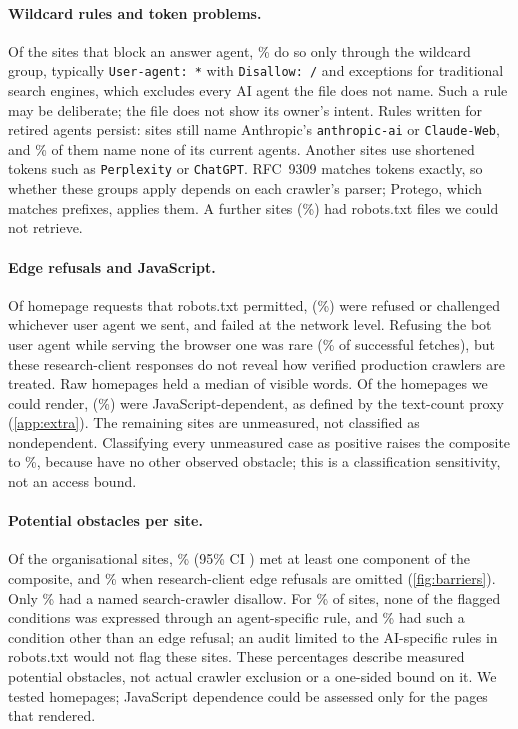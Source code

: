 \documentclass[11pt]{article}
\newcommand{\agent}[1]{\texttt{#1}}
\begin{document}
\paragraph{Wildcard rules and token problems.}
\label{sec:config}
Of the sites that block an answer agent, \PctInherited\% do so only through the wildcard group, typically
\texttt{User-agent: *} with \texttt{Disallow: /} and exceptions for traditional search engines, which excludes every
AI agent the file does not name. Such a rule may be deliberate; the file does not show its owner's intent. Rules written for retired agents persist: \NLegacy{} sites still name Anthropic's
\agent{anthropic-ai} or \agent{Claude-Web}, and \PctLegacyOnly\% of them name none of its current agents. Another
\NInexact{} sites use shortened tokens such as \texttt{Perplexity} or \texttt{ChatGPT}. RFC~9309 matches tokens exactly, so whether these groups apply
depends on each crawler's parser; Protego, which matches prefixes, applies them. A further \NRobotsUnreach{} sites
(\BarUnreach\%) had robots.txt files we could not retrieve.

\paragraph{Edge refusals and JavaScript.} Of \NAttempted{} homepage requests that robots.txt permitted, \NEdge{}
(\PctEdge\%) were refused or challenged whichever user agent we sent, and \NErrors{} failed at the network level.
Refusing the bot user agent while serving the browser one was rare (\PctBotWall\% of successful fetches), but these research-client responses do not reveal how verified production crawlers are treated. Raw homepages held a median of \MedianRawWords{} visible words.
Of the \NRendered{} homepages we could render, \NJsDependent{} (\PctJsDependent\%) were JavaScript-dependent,
as defined by the text-count proxy (\cref{app:extra}). The remaining \RevJSUnmeasured{} sites are unmeasured,
not classified as nondependent. Classifying every unmeasured case as positive raises the composite to
\RevCompositeUpper\%, because \RevJSUnmeasuredNoOther{} have no other observed obstacle; this is a classification
sensitivity, not an access bound.

\paragraph{Potential obstacles per site.} Of the \NSites{} organisational sites, \BarAny\% (95\% CI
\CIBarAny) met at least one component of the composite, and \BarNoEdge\% when research-client edge refusals are
omitted (\cref{fig:barriers}). Only \BarNamed\% had a named search-crawler disallow. For \BarImplicitOnly\% of sites,
none of the flagged conditions was expressed through an agent-specific rule, and \BarImplicitNoEdge\% had such a
condition other than an edge refusal; an audit limited to the AI-specific rules in robots.txt would not flag these
sites. These percentages describe measured potential obstacles, not actual crawler exclusion or a one-sided bound on
it. We tested homepages; JavaScript dependence could be assessed only for the \NRendered{} pages that rendered.
\end{document}
